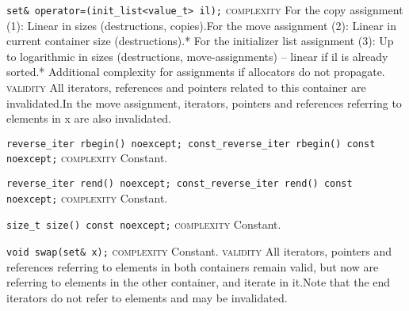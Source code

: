 \noindent{}\hspace*{0.25em}\lstinline[basicstyle=\ttfamily\color{corange}]{set& operator=(init_list<value_t> il);} \textsc{complexity} For the copy assignment (1): Linear in sizes (destructions, copies).For the move assignment (2): Linear in current container size (destructions).* For the initializer list assignment (3): Up to logarithmic in sizes (destructions, move-assignments) -- linear if il is already sorted.* Additional complexity for assignments if allocators do not propagate. \textsc{validity} All iterators, references and pointers related to this container are invalidated.In the move assignment, iterators, pointers and references referring to elements in x are also invalidated.\\\vspace{-0.6em}

\noindent{}\hspace*{0.25em}\lstinline[basicstyle=\ttfamily\color{cgreen}]{reverse_iter rbegin() noexcept; const_reverse_iter rbegin() const noexcept;} \textsc{complexity} Constant.\\\vspace{-0.6em}

\noindent{}\hspace*{0.25em}\lstinline[basicstyle=\ttfamily\color{cgreen}]{reverse_iter rend() noexcept; const_reverse_iter rend() const noexcept;} \textsc{complexity} Constant.\\\vspace{-0.6em}

\noindent{}\hspace*{0.25em}\lstinline[basicstyle=\ttfamily\color{cgreen}]{size_t size() const noexcept;} \textsc{complexity} Constant.\\\vspace{-0.6em}

\noindent{}\hspace*{0.25em}\lstinline[basicstyle=\ttfamily\color{cgreen}]{void swap(set& x);} \textsc{complexity} Constant. \textsc{validity} All iterators, pointers and references referring to elements in both containers remain valid, but now are referring to elements in the other container, and iterate in it.Note that the end iterators do not refer to elements and may be invalidated.\\\vspace{-0.6em}

